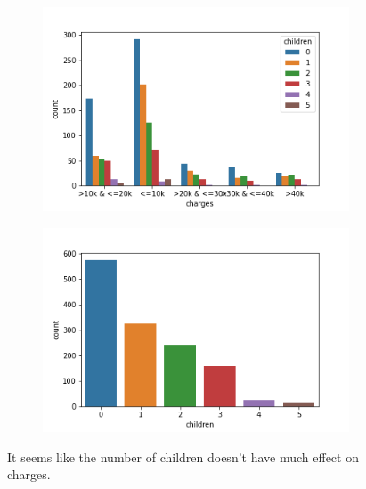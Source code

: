 \documentclass[12pt]{article}
\begin{document}
\begin{figure}[H]
\centering
\begin{subfigure}{0.5\textwidth}
\includegraphics[width=\textwidth]{children.png}
\end{subfigure}
\begin{subfigure}{0.5\textwidth}
\includegraphics[width=\textwidth]{children_dist.png}
\end{subfigure}
\label{mesh:fig1}
\caption{It seems like the number of children doesn't have much effect on charges.  }
\end{figure}
\end{document}
